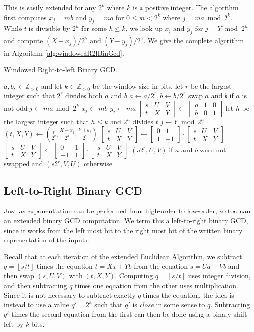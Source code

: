 \documentclass{ucalgthes1}
\theoremstyle{definition}
\newcommand{\ZZgtz}{\mathbb{Z}_{>0}}
\newcommand{\matrixtt}[4]{\left[ \begin{array}{rr} #1 & #2 \\ #3 & #4 \end{array} \right]}
\newcommand{\matrixThreeTwo}[6]{\left[ \begin{array}{rrr} #1 & #2 & #3 \\ #4 & #5 & #6 \end{array} \right]}
\newcommand{\floor}[1]{\left\lfloor #1 \right\rfloor}
\begin{document}
This is easily extended for any $2^k$ where $k$ is a positive integer.  The algorithm first computes $x_j = mb$ and $y_j = ma$ for $0 \le m < 2^k$ where $j = ma \bmod 2^k$.  While $t$ is divisible by $2^h$ for some $h \le k$, we look up $x_j$ and $y_j$ for $j = Y \bmod 2^h$ and compute $(X + x_j) / 2^h$ and $(Y - y_j) / 2^h$.  We give the complete algorithm in Algorithm \ref{alg:windowedR2lBinGcd}.

\begin{algorithm}[h]
\caption{Windowed Right-to-left Binary GCD.}
\label{alg:windowedR2lBinGcd}
\begin{algorithmic}[1]
\REQUIRE $a,b, \in \ZZgtz$ and let $k \in \ZZgtz$ be the window size in bits.
\STATE let $r$ be the largest integer such that $2^r$ divides both $a$ and $b$
\STATE $a \gets a / 2^r, b \gets b / 2^r$
\STATE swap $a$ and $b$ if $a$ is not odd
	\STATE $j \gets ma \bmod 2^k$
	\STATE $x_j \gets mb$
	\STATE $y_j \gets ma$
\ENDFOR
\STATE $\matrixThreeTwo{s}{U}{V}{t}{X}{Y} \gets \matrixThreeTwo{a}{1}{0}{b}{0}{1}$
		\STATE let $h$ be the largest integer such that $h \le k$ and $2^h$ divides $t$
		\STATE $j \gets Y \bmod 2^h$
		\STATE $(t, X, Y) \gets \left( \frac{t}{2^k}, \frac{X+x_j}{2^h}, \frac{Y+y_j}{2^h} \right)$  
	\ENDWHILE
		\STATE $\matrixThreeTwo{s}{U}{V}{t}{X}{Y} \gets \matrixtt{0}{1}{1}{-1} \cdot \matrixThreeTwo{s}{U}{V}{t}{X}{Y}$
	\ELSE
		\STATE $\matrixThreeTwo{s}{U}{V}{t}{X}{Y} \gets \matrixtt{0}{1}{-1}{1} \cdot \matrixThreeTwo{s}{U}{V}{t}{X}{Y}$
	\ENDIF
\ENDWHILE
\RETURN $(s2^r, U, V)$ if $a$ and $b$ were not swapped and $(s2^r, V, U)$ otherwise
\end{algorithmic}
\end{algorithm}

\subsection{Left-to-Right Binary GCD}

Just as exponentiation can be performed from high-order to low-order, so too can an extended binary GCD computation.  We term this a left-to-right binary GCD, since it works from the left most bit to the right most bit of the written binary representation of the inputs.

Recall that at each iteration of the extended Euclidean Algorithm, we subtract $q = \floor{s/t}$ times the equation $t = Xa + Yb$ from the equation $s = Ua + Vb$ and then swap $(s, U, V)$ with $(t, X, Y)$.  Computing $q=\floor{s/t}$ uses integer division, and then subtracting $q$ times one equation from the other uses multiplication.  Since it is not necessary to subtract exactly $q$ times the equation, the idea is instead to use a value $q' = 2^k$ such that $q'$ is \emph{close} in some sense to $q$.  Subtracting $q'$ times the second equation from the first can then be done using a binary shift left by $k$ bits.
\end{document}
